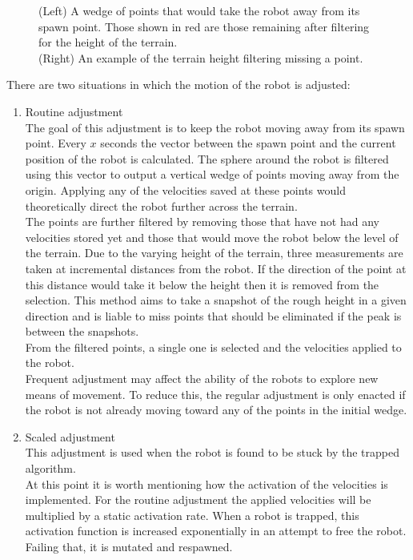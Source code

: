 \documentclass{article}
\begin{document}
\begin{figure}[H]
\begin{minipage}[t]{0.65\textwidth}
\vspace*{-3mm}
\caption{(Left) A wedge of points that would take the robot away from its spawn point. Those shown in red are those remaining after filtering for the height of the terrain.\\
(Right) An example of the terrain height filtering missing a point.} 
\end{minipage}
\end{figure}

\noindent There are two situations in which the motion of the robot is adjusted:
\begin{enumerate}
\item Routine adjustment\\
The goal of this adjustment is to keep the robot moving away from its spawn point. Every $x$ seconds the vector between the spawn point and the current position of the robot is calculated. The sphere around the robot is filtered using this vector to output a vertical wedge of points moving away from the origin. Applying any of the velocities saved at these points would theoretically direct the robot further across the terrain. \\
The points are further filtered by removing those that have not had any velocities stored yet and those that would move the robot below the level of the terrain. Due to the varying height of the terrain, three measurements are taken at incremental distances from the robot. If the direction of the point at this distance would take it below the height then it is removed from the selection. This method aims to take a snapshot of the rough height in a given direction and is liable to miss points that should be eliminated if the peak is between the snapshots. \\
From the filtered points, a single one is selected and the velocities applied to the robot. \\
Frequent adjustment may affect the ability of the robots to explore new means of movement. To reduce this, the regular adjustment is only enacted if the robot is not already moving toward any of the points in the initial wedge. 
\item Scaled adjustment\\
This adjustment is used when the robot is found to be stuck by the trapped algorithm.\\
At this point it is worth mentioning how the activation of the velocities is implemented. For the routine adjustment the applied velocities will be multiplied by a static activation rate. When a robot is trapped, this activation function is increased exponentially in an attempt to free the robot. Failing that, it is mutated and respawned. 

\end{enumerate}
\end{document}
